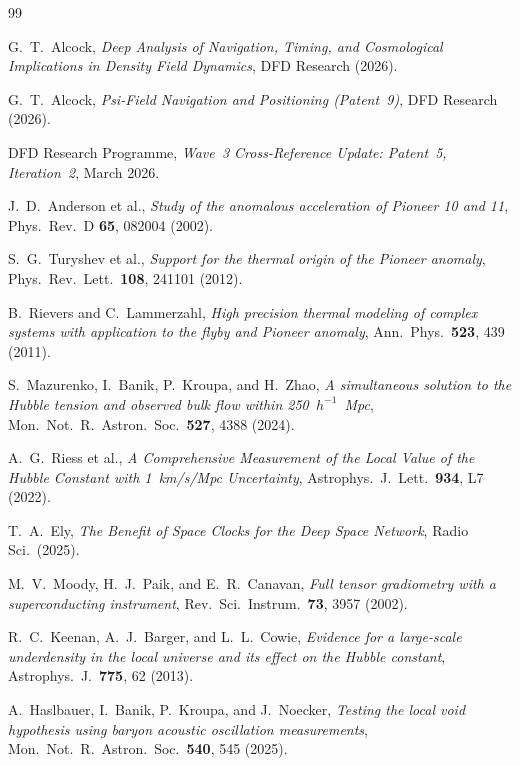 \documentclass[aps,prd,twocolumn,superscriptaddress,nofootinbib,longbibliography]{revtex4-2}
\begin{document}
\begin{thebibliography}{99}

G.~T.~Alcock,
\textit{Deep Analysis of Navigation, Timing, and Cosmological
Implications in Density Field Dynamics},
DFD Research (2026).

G.~T.~Alcock,
\textit{Psi-Field Navigation and Positioning (Patent~9)},
DFD Research (2026).

DFD Research Programme,
\textit{Wave~3 Cross-Reference Update: Patent~5, Iteration~2},
March 2026.

J.~D.~Anderson et al.,
\textit{Study of the anomalous acceleration of Pioneer 10 and 11},
Phys.\ Rev.\ D \textbf{65}, 082004 (2002).

S.~G.~Turyshev et al.,
\textit{Support for the thermal origin of the Pioneer anomaly},
Phys.\ Rev.\ Lett.\ \textbf{108}, 241101 (2012).

B.~Rievers and C.~Lammerzahl,
\textit{High precision thermal modeling of complex systems with
application to the flyby and Pioneer anomaly},
Ann.\ Phys.\ \textbf{523}, 439 (2011).

S.~Mazurenko, I.~Banik, P.~Kroupa, and H.~Zhao,
\textit{A simultaneous solution to the Hubble tension and observed
bulk flow within 250~$h^{-1}$~Mpc},
Mon.\ Not.\ R.\ Astron.\ Soc.\ \textbf{527}, 4388 (2024).

A.~G.~Riess et al.,
\textit{A Comprehensive Measurement of the Local Value of the Hubble
Constant with 1~km/s/Mpc Uncertainty},
Astrophys.\ J.\ Lett.\ \textbf{934}, L7 (2022).

T.~A.~Ely,
\textit{The Benefit of Space Clocks for the Deep Space Network},
Radio Sci.\ (2025).

M.~V.~Moody, H.~J.~Paik, and E.~R.~Canavan,
\textit{Full tensor gradiometry with a superconducting instrument},
Rev.\ Sci.\ Instrum.\ \textbf{73}, 3957 (2002).

R.~C.~Keenan, A.~J.~Barger, and L.~L.~Cowie,
\textit{Evidence for a large-scale underdensity in the local universe
and its effect on the Hubble constant},
Astrophys.\ J.\ \textbf{775}, 62 (2013).

A.~Haslbauer, I.~Banik, P.~Kroupa, and J.~Noecker,
\textit{Testing the local void hypothesis using baryon acoustic
oscillation measurements},
Mon.\ Not.\ R.\ Astron.\ Soc.\ \textbf{540}, 545 (2025).

\end{thebibliography}
\end{document}
